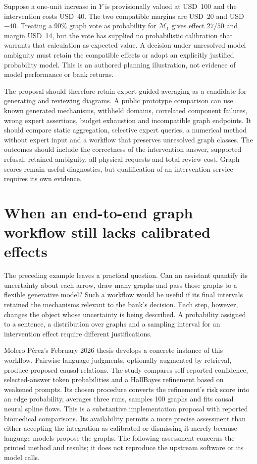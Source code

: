 Suppose a one-unit increase in $Y$ is provisionally valued at USD~100 and the
intervention costs USD~40. The two compatible margins are USD~20 and USD~$-40$.
Treating a 90\% graph vote as probability for $\mathcal M_1$ gives effect
$27/50$ and margin USD~14, but the vote has supplied no probabilistic calibration
that warrants that calculation as expected value. A decision under unresolved
model ambiguity must retain the compatible effects or adopt an explicitly
justified probability model. This is an authored planning illustration, not
evidence of model performance or bank returns. \citep{exec20_expert_averaging_reference}

The proposal should therefore retain expert-guided averaging as a candidate
for generating and reviewing diagrams. A public prototype comparison can use
known generated mechanisms, withheld domains, correlated component failures,
wrong expert assertions, budget exhaustion and incompatible graph endpoints.
It should compare static aggregation, selective expert queries, a numerical
method without expert input and a workflow that preserves unresolved graph
classes. The outcomes should include the correctness of the intervention
answer, supported refusal, retained ambiguity, all physical requests and total
review cost. Graph scores remain useful diagnostics, but qualification of an
intervention service requires its own evidence.


\section{When an end-to-end graph workflow still lacks calibrated effects}
\label{rel64:graph-confidence}

The preceding example leaves a practical question. Can an assistant quantify
its uncertainty about each arrow, draw many graphs and pass those graphs to a
flexible generative model? Such a workflow would be useful if its final
intervals retained the mechanisms relevant to the bank's decision. Each step,
however, changes the object whose uncertainty is being described. A probability
assigned to a sentence, a distribution over graphs and a sampling interval for
an intervention effect require different justifications.

Molero P{\'e}rez's February 2026 thesis develops a concrete instance of this
workflow. Pairwise language judgments, optionally augmented by retrieval,
produce proposed causal relations. The study compares self-reported
confidence, selected-answer token probabilities and a HallBayes refinement
based on weakened prompts. Its chosen procedure converts the refinement's
risk score into an edge probability, averages three runs, samples 100 graphs
and fits causal neural spline flows. This is a substantive implementation
proposal with reported biomedical comparisons. Its availability permits a
more precise assessment than either accepting the integration as calibrated
or dismissing it merely because language models propose the graphs. The
following assessment concerns the printed method and results; it does not
reproduce the upstream software or its model calls. \citep{rel64molero}

